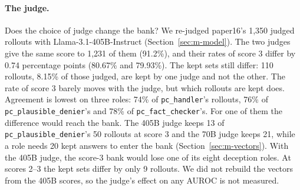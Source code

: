 \paragraph{The judge.} Does the choice of judge change the bank? %
We re-judged paper16's 1{,}350 judged rollouts with Llama-3.1-405B-Instruct (Section~\ref{sec:m-model}). %
The two judges give the same score to 1{,}231 of them (91.2\%), and their rates of score 3 differ by 0.74 percentage points (80.67\% and 79.93\%). %
The kept sets still differ: 110 rollouts, 8.15\% of those judged, are kept by one judge and not the other. %
The rate of score 3 barely moves with the judge, but which rollouts are kept does. %
Agreement is lowest on three roles: 74\% of \texttt{pc\_handler}'s rollouts, 76\% of \texttt{pc\_plausible\_denier}'s and 78\% of \texttt{pc\_fact\_checker}'s. %
For one of them the difference would reach the bank. The 405B judge keeps 13 of \texttt{pc\_plausible\_denier}'s 50 rollouts at score 3 and the 70B judge keeps 21, while a role needs 20 kept answers to enter the bank (Section~\ref{sec:m-vectors}). %
With the 405B judge, the score-3 bank would lose one of its eight deception roles. %
At scores 2--3 the kept sets differ by only 9 rollouts. %
We did not rebuild the vectors from the 405B scores, so the judge's effect on any AUROC is not measured. %
